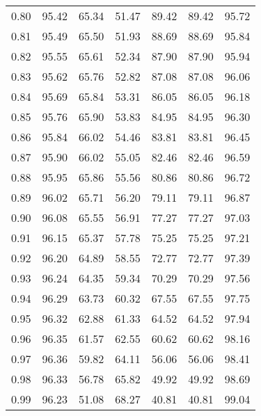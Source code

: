 \begin{tabular}{|c|c|c|c|c|c|c|}
      0.80 &     95.42 &     65.34 &      51.47 &   89.42 &      89.42 &         95.72 \\
      0.81 &     95.49 &     65.50 &      51.93 &   88.69 &      88.69 &         95.84 \\
      0.82 &     95.55 &     65.61 &      52.34 &   87.90 &      87.90 &         95.94 \\
      0.83 &     95.62 &     65.76 &      52.82 &   87.08 &      87.08 &         96.06 \\
      0.84 &     95.69 &     65.84 &      53.31 &   86.05 &      86.05 &         96.18 \\
      0.85 &     95.76 &     65.90 &      53.83 &   84.95 &      84.95 &         96.30 \\
      0.86 &     95.84 &     66.02 &      54.46 &   83.81 &      83.81 &         96.45 \\
      0.87 &     95.90 &     66.02 &      55.05 &   82.46 &      82.46 &         96.59 \\
      0.88 &     95.95 &     65.86 &      55.56 &   80.86 &      80.86 &         96.72 \\
      0.89 &     96.02 &     65.71 &      56.20 &   79.11 &      79.11 &         96.87 \\
      0.90 &     96.08 &     65.55 &      56.91 &   77.27 &      77.27 &         97.03 \\
      0.91 &     96.15 &     65.37 &      57.78 &   75.25 &      75.25 &         97.21 \\
      0.92 &     96.20 &     64.89 &      58.55 &   72.77 &      72.77 &         97.39 \\
      0.93 &     96.24 &     64.35 &      59.34 &   70.29 &      70.29 &         97.56 \\
      0.94 &     96.29 &     63.73 &      60.32 &   67.55 &      67.55 &         97.75 \\
      0.95 &     96.32 &     62.88 &      61.33 &   64.52 &      64.52 &         97.94 \\
      0.96 &     96.35 &     61.57 &      62.55 &   60.62 &      60.62 &         98.16 \\
      0.97 &     96.36 &     59.82 &      64.11 &   56.06 &      56.06 &         98.41 \\
      0.98 &     96.33 &     56.78 &      65.82 &   49.92 &      49.92 &         98.69 \\
      0.99 &     96.23 &     51.08 &      68.27 &   40.81 &      40.81 &         99.04 \\
\bottomrule
\end{tabular}
